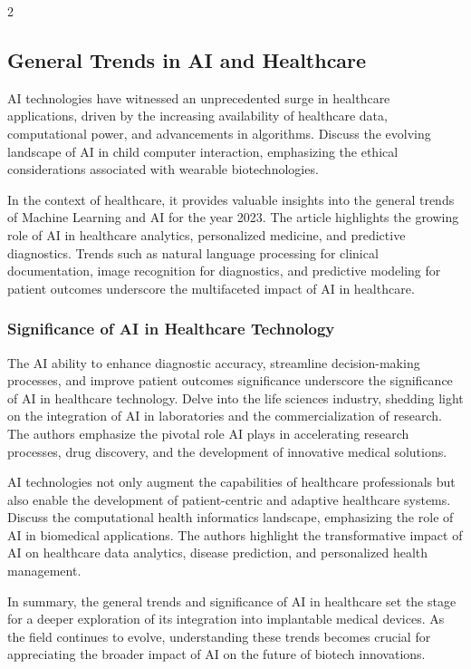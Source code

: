 \documentclass[12pt,oneside]{academia}
\theoremstyle{remark}
\begin{document}
\begin{multicols}{2}
\subsection{General Trends in AI and Healthcare}
AI technologies have witnessed an unprecedented surge in healthcare applications, driven by the increasing availability of healthcare data, computational power, and advancements in algorithms. Discuss the evolving landscape of AI in child computer interaction, emphasizing the ethical considerations associated with wearable biotechnologies.

In the context of healthcare, it provides valuable insights into the general trends of Machine Learning and AI for the year 2023. The article highlights the growing role of AI in healthcare analytics, personalized medicine, and predictive diagnostics. Trends such as natural language processing for clinical documentation, image recognition for diagnostics, and predictive modeling for patient outcomes underscore the multifaceted impact of AI in healthcare.

\subsubsection{Significance of AI in Healthcare Technology}
The AI ability to enhance diagnostic accuracy, streamline decision-making processes, and improve patient outcomes significance underscore the significance of AI in healthcare technology. Delve into the life sciences industry, shedding light on the integration of AI in laboratories and the commercialization of research. The authors emphasize the pivotal role AI plays in accelerating research processes, drug discovery, and the development of innovative medical solutions.

AI technologies not only augment the capabilities of healthcare professionals but also enable the development of patient-centric and adaptive healthcare systems. Discuss the computational health informatics landscape, emphasizing the role of AI in biomedical applications. The authors highlight the transformative impact of AI on healthcare data analytics, disease prediction, and personalized health management.

In summary, the general trends and significance of AI in healthcare set the stage for a deeper exploration of its integration into implantable medical devices. As the field continues to evolve, understanding these trends becomes crucial for appreciating the broader impact of AI on the future of biotech innovations.


\end{multicols}
\end{document}
